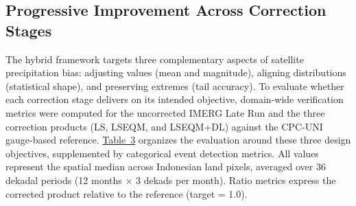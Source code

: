 \documentclass[11pt,a4paper]{article}
\begin{document}
\subsection{Progressive Improvement Across Correction
Stages}\label{progressive-improvement}

The hybrid framework targets three complementary aspects of satellite
precipitation bias: adjusting values (mean and magnitude), aligning
distributions (statistical shape), and preserving extremes (tail
accuracy). To evaluate whether each correction stage delivers on its
intended objective, domain-wide verification metrics were computed for
the uncorrected IMERG Late Run and the three correction products (LS,
LSEQM, and LSEQM+DL) against the CPC-UNI gauge-based reference. \hyperref[tab:3]{Table~3}
organizes the evaluation around these three design objectives,
supplemented by categorical event detection metrics. All values
represent the spatial median across Indonesian land pixels, averaged
over 36 dekadal periods (12 months \(\times\) 3 dekads per month). Ratio
metrics express the corrected product relative to the reference (target
= 1.0).
\end{document}
